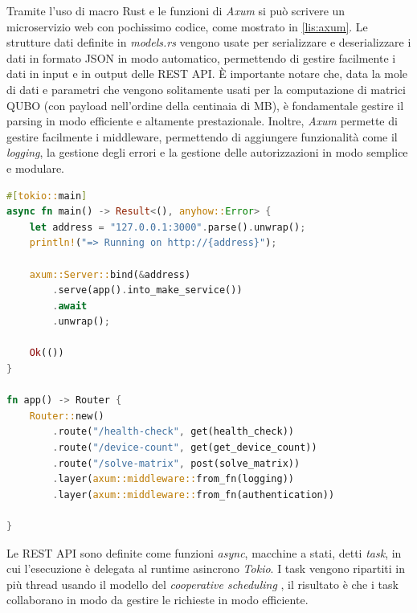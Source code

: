 
Tramite l'uso di macro Rust e le funzioni di \textit{Axum} si può scrivere un microservizio web con pochissimo codice, come mostrato in \ref{lis:axum}. Le strutture dati definite in \textit{models.rs} vengono usate per serializzare e deserializzare i dati in formato \gls{JSON} in modo automatico, permettendo di gestire facilmente i dati in input e in output delle REST \gls{API}. È importante notare che, data la mole di dati e parametri che vengono solitamente usati per la computazione di matrici \gls{QUBO} (con payload nell'ordine della centinaia di MB), è fondamentale gestire il parsing in modo efficiente e altamente prestazionale.
Inoltre, \textit{Axum} permette di gestire facilmente i middleware, permettendo di aggiungere funzionalità come il \textit{logging}, la gestione degli errori e la gestione delle autorizzazioni in modo semplice e modulare.

\vspace{5mm}
\begin{lstlisting}[language=Rust, caption=Inizializzazione Axum, label=lis:axum]
#[tokio::main]
async fn main() -> Result<(), anyhow::Error> {
    let address = "127.0.0.1:3000".parse().unwrap();
    println!("=> Running on http://{address}");

    axum::Server::bind(&address)
        .serve(app().into_make_service())
        .await
        .unwrap();

    Ok(())
}

fn app() -> Router {
    Router::new()
        .route("/health-check", get(health_check))
        .route("/device-count", get(get_device_count))
        .route("/solve-matrix", post(solve_matrix))
        .layer(axum::middleware::from_fn(logging))
        .layer(axum::middleware::from_fn(authentication))

}
\end{lstlisting}
\vspace{5mm}

\newpage

Le REST \gls{API} sono definite come funzioni \textit{async}, macchine a stati, detti \textit{task}, in cui l'esecuzione è delegata al runtime asincrono \textit{Tokio}. I task vengono ripartiti in più thread usando il modello del \textit{cooperative scheduling} \cite[]{Rust:Tokio_sched}, il risultato è che i task collaborano in modo da gestire le richieste in modo efficiente.

